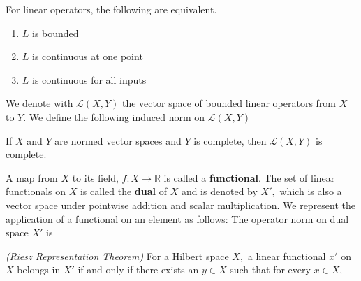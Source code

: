 \begin{theorem}
    For linear operators, the following are equivalent.
    \begin{enumerate}
        \item $L$ is bounded
        \item $L$ is continuous at one point
        \item $L$ is continuous for all inputs
    \end{enumerate}
\end{theorem}
We denote with $\mathcal{L}(X,Y)$ the vector space of  bounded linear operators from $X$ to $Y$. We define the following induced norm on $\mathcal{L}(X,Y)$
\begin{theorem}
    If $X$ and $Y$ are normed vector spaces and $Y$ is complete, then $\mathcal{L}(X,Y)$ is complete.
\end{theorem}
A map from $X$ to its field, $f:X\rightarrow \mathbb{R}$ is called a \textbf{functional}. The set of linear functionals on $X$ is called the \textbf{dual} of $X$ and is denoted by $X',$ which is also a vector space under pointwise addition and scalar multiplication. We represent the application of a functional on an element as follows:
The operator norm on dual space $X'$ is
\begin{theorem}
    \textit{(Riesz Representation Theorem)} For a Hilbert space $X,$ a linear functional $x'$ on $X$ belongs in $X'$ if and only if there exists an $y\in X$ such that for every $x\in X,$
\end{theorem}

